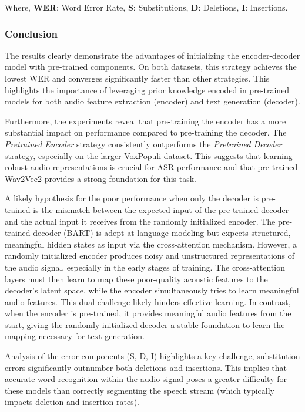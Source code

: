 Where, \textbf{WER}: Word Error Rate, \textbf{S}: Substitutions, \textbf{D}: Deletions, \textbf{I}: Insertions.
\newline

\subsubsection{Conclusion}

The results clearly demonstrate the advantages of initializing the encoder-decoder model with pre-trained components. On both datasets, this strategy achieves the lowest WER and converges significantly faster than other strategies. This highlights the importance of leveraging prior knowledge encoded in pre-trained models for both audio feature extraction (encoder) and text generation (decoder).

Furthermore, the experiments reveal that pre-training the encoder has a more substantial impact on performance compared to pre-training the decoder. The \textit{Pretrained Encoder} strategy consistently outperforms the \textit{Pretrained Decoder} strategy, especially on the larger VoxPopuli dataset. This suggests that learning robust audio representations is crucial for ASR performance and that pre-trained Wav2Vec2 provides a strong foundation for this task.

A likely hypothesis for the poor performance when only the decoder is pre-trained is the mismatch between the expected input of the pre-trained decoder and the actual input it receives from the randomly initialized encoder. The pre-trained decoder (BART) is adept at language modeling but expects structured, meaningful hidden states as input via the cross-attention mechanism. However, a randomly initialized encoder produces noisy and unstructured representations of the audio signal, especially in the early stages of training. The cross-attention layers must then learn to map these poor-quality acoustic features to the decoder's latent space, while the encoder simultaneously tries to learn meaningful audio features. This dual challenge likely hinders effective learning. In contrast, when the encoder is pre-trained, it provides meaningful audio features from the start, giving the randomly initialized decoder a stable foundation to learn the mapping necessary for text generation.

Analysis of the error components (S, D, I) highlights a key challenge, substitution errors significantly outnumber both deletions and insertions. This implies that accurate word recognition within the audio signal poses a greater difficulty for these models than correctly segmenting the speech stream (which typically impacts deletion and insertion rates).

